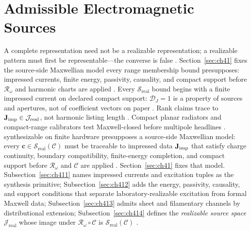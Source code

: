 \section{Admissible Electromagnetic Sources}
A complete representation need not be a realizable representation; a realizable pattern must first be representable---the converse is false \cite{stratton1941}.
\label{sec:ch41}
Section~\ref{sec:ch41} fixes the source-side Maxwellian model every range membership bound presupposes: impressed currents, finite energy, passivity, causality, and compact support before $\mathcal{R}_\omega$ and harmonic charts are applied \cite{stratton1941}.
Every $\mathcal{S}_{\mathrm{real}}$ bound begins with a finite impressed current on declared compact support: $\mathcal{D}_J=1$ is a property of sources and apertures, not of coefficient vectors on paper \cite{stratton1941}.
Rank claims trace to $\mathbf{J}_{\mathrm{imp}}\in\mathcal{J}_{\mathrm{real}}$, not harmonic listing length \cite{devaney2004}. Compact planar radiators and compact-range calibrators test Maxwell-closed before multipole headlines \cite{hansen1988}.
\medskip
synthesizable on finite hardware presupposes a source-side Maxwellian model: every
\(\mathbf{c}\in\mathcal{S}_{\mathrm{real}}(\mathcal{C})\) must be traceable to impressed data
\(\mathbf{J}_{\mathrm{imp}}\) that satisfy charge continuity, boundary compatibility, finite-energy completion, and
compact support before \(\mathcal{R}_\omega\) and \(\mathcal{C}\) are applied
\cite{stratton1941}. Section~\ref{sec:ch41} fixes that model. Subsection~\ref{sec:ch411}
names impressed currents and excitation tuples as the synthesis primitive; Subsection~\ref{sec:ch412}
adds the energy, passivity, causality, and support conditions that separate laboratory-realizable
excitation from formal Maxwell data; Subsection~\ref{sec:ch413} admits sheet and filamentary
channels by distributional extension; Subsection~\ref{sec:ch414} defines the \emph{realizable source
space} \(\mathcal{J}_{\mathrm{real}}\) whose image under \(\mathcal{R}_\omega\circ\mathcal{C}\) is
\(\mathcal{S}_{\mathrm{real}}(\mathcal{C})\) \cite{devaney2004}.
